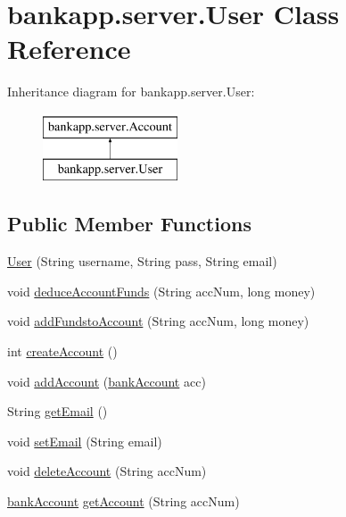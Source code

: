 \hypertarget{classbankapp_1_1server_1_1_user}{}\section{bankapp.\+server.\+User Class Reference}
\label{classbankapp_1_1server_1_1_user}
Inheritance diagram for bankapp.\+server.\+User\+:\begin{figure}[H]
\begin{center}
\leavevmode
\includegraphics[height=2.000000cm]{classbankapp_1_1server_1_1_user}
\end{center}
\end{figure}
\subsection*{Public Member Functions}
\begin{DoxyCompactItemize}
\item 
\hyperlink{classbankapp_1_1server_1_1_user_ae5d0c0c37ed136f1c3e7534a4af49105}{User} (String username, String pass, String email)
\item 
void \hyperlink{classbankapp_1_1server_1_1_user_a6527a6277676b487137630f595c26248}{deduce\+Account\+Funds} (String acc\+Num, long money)
\item 
void \hyperlink{classbankapp_1_1server_1_1_user_a0da7cce04ab84b5d4ffddeb994516632}{add\+Fundsto\+Account} (String acc\+Num, long money)
\item 
int \hyperlink{classbankapp_1_1server_1_1_user_aa8e72fdac74d28d978bf38711b15dba5}{create\+Account} ()
\item 
void \hyperlink{classbankapp_1_1server_1_1_user_adcf98c41bd09b94a9a068c9bb2fa1f5e}{add\+Account} (\hyperlink{classbankapp_1_1server_1_1bank_account}{bank\+Account} acc)
\item 
String \hyperlink{classbankapp_1_1server_1_1_user_a597376bdfa749415e75185e764b3e04f}{get\+Email} ()
\item 
void \hyperlink{classbankapp_1_1server_1_1_user_aef6765beb0d9556f38070c919ca7e732}{set\+Email} (String email)
\item 
void \hyperlink{classbankapp_1_1server_1_1_user_a90f12d3eae9a484d0f6acc6e74f4a27d}{delete\+Account} (String acc\+Num)
\item 
\hyperlink{classbankapp_1_1server_1_1bank_account}{bank\+Account} \hyperlink{classbankapp_1_1server_1_1_user_a88c5fb41ca03f1b131322ef486fb677d}{get\+Account} (String acc\+Num)
\end{DoxyCompactItemize}


